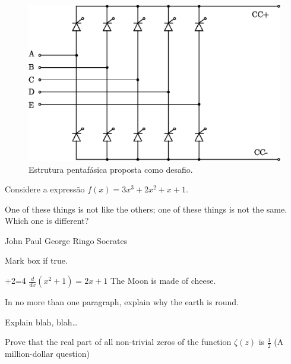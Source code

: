 \documentclass[11pt]{utfpr-exam}
\begin{document}
\begin{questions}
		\begin{figure}[!h]
			\centering
			\includegraphics[width=0.7\linewidth]{figuras/TiristorPentafase}
			\caption{Estrutura pentafásica proposta como desafio.}
			\label{fig:TiristorPentafase}
		\end{figure}
				
	
				
	
	\question[20] Considere a expressão $f(x)=3x^3+2x^2+x+1$.
	\noaddpoints %

	
	\question[2] One of these things is not like the others; one of these
	things is not the same. Which one is different?
	\begin{choices}
		\choice John
		\choice Paul
		\choice George
		\choice Ringo
		\choice Socrates
	\end{choices}
	

	
	\question[3] Mark box if true.
	\addpoints
	\begin{checkboxes}
		+2=4
		\choice $\frac{d}{dx} (x^2+1) = 2x+1$
		\choice The Moon is made of cheese.
	\end{checkboxes}
	

	
	\question[10]
	In no more than one paragraph, explain why the earth is round.
	\makeemptybox{\fill}
	
	\newpage
	
	\question[20]
	Explain blah, blah\ldots
	\fillwithlines{\fill}
	
	\newpage
	
	
			
				
		\bonusquestion[30] Prove that the real part of all non-trivial zeros of the function 
		\(\zeta(z)\) is \(\frac{1}{2}\) (A million-dollar question)
			\fillwithdottedlines{8em}
				
				
	
			\end{questions}
		
		
			
		
		
\end{document}
